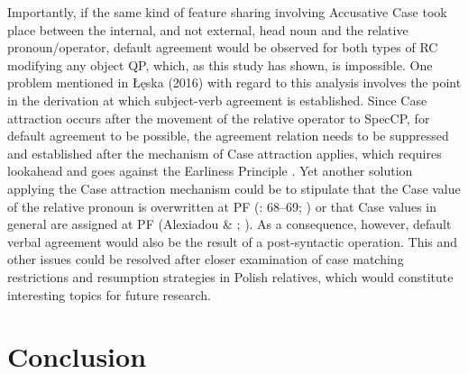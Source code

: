 \documentclass[output=paper]{langsci/langscibook}
\begin{document}
Importantly, if the same kind of feature sharing involving Accusative Case took place between the internal, and not external, head noun and the relative pronoun/operator, default agreement would be observed for both types of RC modifying any object QP, which, as this study has shown, is impossible. One problem mentioned in Łęska (2016) with regard to this analysis involves the point in the derivation at which subject-verb agreement is established. Since Case attraction occurs after the movement of the relative operator to SpecCP, for default agreement to be possible, the agreement relation needs to be suppressed and established after the mechanism of Case attraction applies, which requires lookahead and goes against the Earliness Principle \citep{Pesetsky1989}. Yet another solution applying the Case attraction mechanism could be to stipulate that the Case value of the relative pronoun is overwritten at PF (\citealt{Bianchi2000}: 68–69; \citealt{Spyropolous2011}) or that Case values in general are assigned at PF (Alexiadou \& \citealt{Varlokosta2007}; \citealt{Assmann2014}). As a consequence, however, default verbal agreement would also be the result of a post-syntactic operation. This and other issues could be resolved after closer examination of case matching restrictions and resumption strategies in Polish relatives, which would constitute interesting topics for future research.

\section{Conclusion}%
\end{document}
